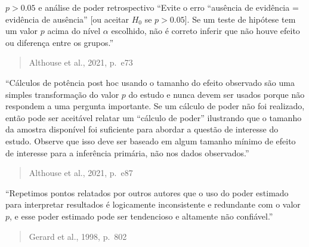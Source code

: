 \documentclass[
  ignorenonframetext,
]{beamer}
\begin{document}
\begin{frame}{\(p>0.05\) e análise de poder retrospectivo}
\protect\hypertarget{p0.05-e-anuxe1lise-de-poder-retrospectivo}{}
``Evite o erro ``ausência de evidência = evidência de ausência'' {[}ou
aceitar \(H_{0}\) se \(p>0.05\){]}. Se um teste de hipótese tem um valor
\(p\) acima do nível \(\alpha\) escolhido, não é correto inferir que não
houve efeito ou diferença entre os grupos.''

\begin{quote}
Althouse et al., 2021, p.~e73
\end{quote}

``Cálculos de potência post hoc usando o tamanho do efeito observado são
uma simples transformação do valor \(p\) do estudo e nunca devem ser
usados porque não respondem a uma pergunta importante. Se um cálculo de
poder não foi realizado, então pode ser aceitável relatar um ``cálculo
de poder'' ilustrando que o tamanho da amostra disponível foi suficiente
para abordar a questão de interesse do estudo. Observe que isso deve ser
baseado em algum tamanho mínimo de efeito de interesse para a inferência
primária, não nos dados observados.''

\begin{quote}
Althouse et al., 2021, p.~e87
\end{quote}

``Repetimos pontos relatados por outros autores que o uso do poder
estimado para interpretar resultados é logicamente inconsistente e
redundante com o valor \(p\), e esse poder estimado pode ser tendencioso
e altamente não confiável.''

\begin{quote}
Gerard et al., 1998, p.~802
\end{quote}
\end{frame}
\end{document}
